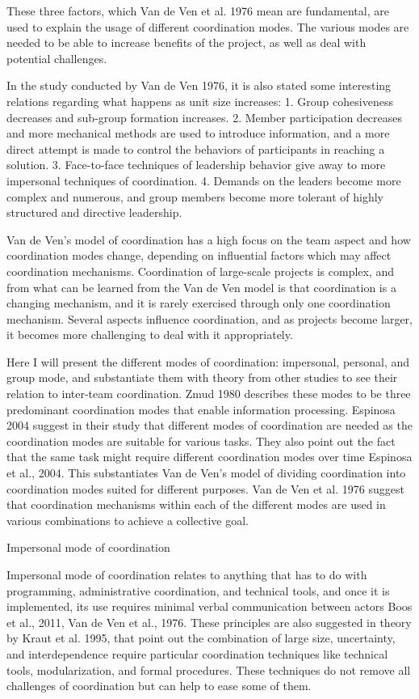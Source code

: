 These three factors, which Van de Ven et al. 1976 mean are fundamental, are used to explain the usage of different coordination modes. The various modes are needed to be able to increase benefits of the project, as well as deal with potential challenges.

In the study conducted by Van de Ven 1976, it is also stated some interesting relations regarding what happens as unit size increases:
1. Group cohesiveness decreases and sub-group formation increases.
2. Member participation decreases and more mechanical methods are used to introduce information, and a more direct attempt is made to control the behaviors of participants in reaching a solution.
3. Face-to-face techniques of leadership behavior give away to more impersonal techniques of coordination.
4. Demands on the leaders become more complex and numerous, and group members become more tolerant of highly structured and directive leadership.

Van de Ven’s model of coordination has a high focus on the team aspect and how coordination modes change, depending on influential factors which may affect coordination mechanisms. Coordination of large-scale projects is complex, and from what can be learned from the Van de Ven model is that coordination is a changing mechanism, and it is rarely exercised through only one coordination mechanism. Several aspects influence coordination, and as projects become larger, it becomes more challenging to deal with it appropriately.

Here I will present the different modes of coordination: impersonal, personal, and group mode, and substantiate them with theory from other studies to see their relation to inter-team coordination. Zmud 1980 describes these modes to be three predominant coordination modes that enable information processing. Espinosa 2004 suggest in their study that different modes of coordination are needed as the coordination modes are suitable for various tasks. They also point out the fact that the same task might require different coordination modes over time Espinosa et al., 2004. This substantiates Van de Ven’s model of dividing coordination into coordination modes suited for different purposes. Van de Ven et al. 1976 suggest that coordination mechanisms within each of the different modes are used in various combinations to achieve a collective goal.

Impersonal mode of coordination

Impersonal mode of coordination relates to anything that has to do with programming, administrative coordination, and technical tools, and once it is implemented, its use requires minimal verbal communication between actors Boos et al., 2011, Van de Ven et al., 1976. These principles are also suggested in theory by Kraut et al. 1995, that point out the combination of large size, uncertainty, and interdependence require particular coordination techniques like technical tools, modularization, and formal procedures. These techniques do not remove all challenges of coordination but can help to ease some of them.

